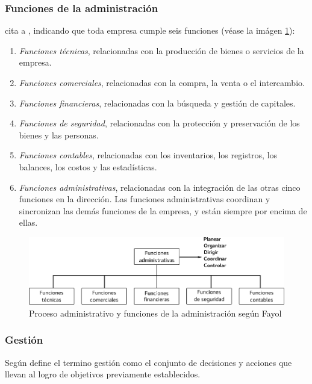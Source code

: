 \subsubsection{Funciones de la administraci\'on}
\cite{chiavenato} cita a \cite{fayol}, indicando que toda empresa cumple seis funciones
(v\'ease la im\'agen \ref{fig:adm}):
\begin{enumerate}
    \item \emph{Funciones t\'ecnicas}, relacionadas con la producci\'on de bienes o
          servicios de la empresa.
    \item \emph{Funciones comerciales}, relacionadas con la compra, la venta o el
          intercambio.
    \item \emph{Funciones financieras}, relacionadas con la b\'usqueda y gesti\'on
          de capitales.
    \item \emph{Funciones de seguridad}, relacionadas con la protecci\'on y preservaci\'on
          de los bienes y las personas.
    \item \emph{Funciones contables}, relacionadas con los inventarios, los registros,
          los balances, los costos y las estad\'isticas.
    \item \emph{Funciones administrativas}, relacionadas con la integraci\'on de las
          otras cinco funciones en la direcci\'on. Las funciones administrativas
          coordinan y sincronizan las dem\'as funciones de la empresa, y est\'an siempre
          por encima de ellas.
\end{enumerate}

\begin{figure}[h]
    \centering
    \captionsetup{justification=centering}
    \includegraphics[width=1.0\textwidth]{Imagenes/Bitmap/funciones_adm}
    \caption{Proceso administrativo y funciones de la administraci\'on seg\'un Fayol}
    \label{fig:adm}
\end{figure}

\subsubsection{Gesti\'on}
Seg\'un \cite{beltran} define el termino gesti\'on como el conjunto de decisiones
y acciones que llevan al logro de objetivos previamente establecidos.

